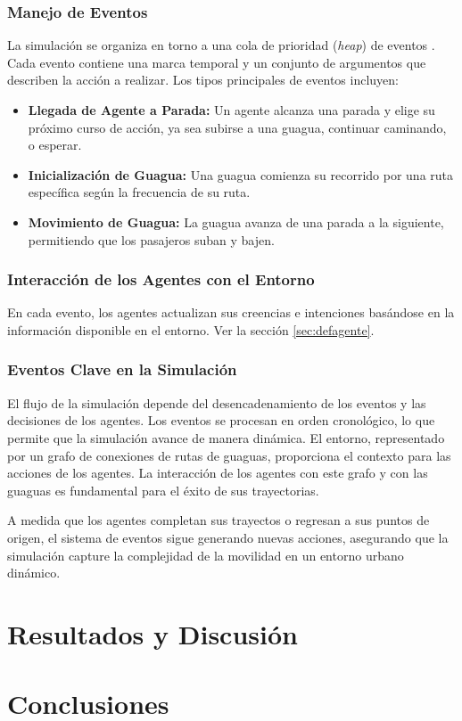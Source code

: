\documentclass[a4paper,12pt]{article}
\begin{document}
\subsubsection{Manejo de Eventos}
La simulación se organiza en torno a una cola de prioridad (\textit{heap}) de eventos \cite{cormen2009introduction}. Cada evento contiene una marca temporal y un conjunto de argumentos que describen la acción a realizar. Los tipos principales de eventos incluyen:
\begin{itemize}
    \item \textbf{Llegada de Agente a Parada:} Un agente alcanza una parada y elige su próximo curso de acción, ya sea subirse a una guagua, continuar caminando, o esperar.
    \item \textbf{Inicialización de Guagua:} Una guagua comienza su recorrido por una ruta específica según la frecuencia de su ruta.
    \item \textbf{Movimiento de Guagua:} La guagua avanza de una parada a la siguiente, permitiendo que los pasajeros suban y bajen.
\end{itemize}

\subsubsection{Interacción de los Agentes con el Entorno}
En cada evento, los agentes actualizan sus creencias e intenciones basándose en la información disponible en el entorno.  Ver la secci\'on \ref{sec:defagente}.

\subsubsection{Eventos Clave en la Simulación}
El flujo de la simulación depende del desencadenamiento de los eventos y las decisiones de los agentes. Los eventos se procesan en orden cronológico, lo que permite que la simulación avance de manera dinámica. El entorno, representado por un grafo de conexiones de rutas de guaguas, proporciona el contexto para las acciones de los agentes. La interacción de los agentes con este grafo y con las guaguas es fundamental para el éxito de sus trayectorias.

A medida que los agentes completan sus trayectos o regresan a sus puntos de origen, el sistema de eventos sigue generando nuevas acciones, asegurando que la simulación capture la complejidad de la movilidad en un entorno urbano dinámico.



\section{Resultados y Discusi\'on}

\section{Conclusiones}


\end{document}
